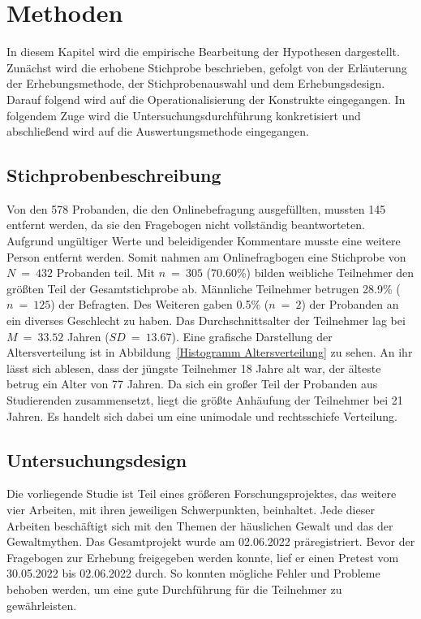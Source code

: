 \chapter{Methoden}   \label{ch_3}
In diesem Kapitel wird die empirische Bearbeitung der Hypothesen dargestellt. Zunächst wird die erhobene Stichprobe beschrieben, gefolgt von der Erläuterung der Erhebungsmethode, der Stichprobenauswahl und dem Erhebungsdesign. Darauf folgend wird auf die Operationalisierung der Konstrukte eingegangen. In folgendem Zuge wird die Untersuchungsdurchführung konkretisiert und abschließend wird auf die Auswertungsmethode eingegangen.

\section{Stichprobenbeschreibung} \label{sec_3.1}
Von den 578 Probanden, die den Onlinebefragung ausgefüllten, mussten 145 entfernt werden, da sie den Fragebogen nicht vollständig beantworteten. Aufgrund ungültiger Werte und beleidigender Kommentare musste eine weitere Person entfernt werden. Somit nahmen am Onlinefragbogen eine Stichprobe von $N~=~432$ Probanden teil. 
Mit $n~=~305$ (70.60\%) bilden weibliche Teilnehmer den größten Teil der Gesamtstichprobe ab. Männliche Teilnehmer betrugen 28.9\% ($n~=~125$) der Befragten. Des Weiteren gaben 0.5\% ($n~=~2$) der Probanden an ein diverses Geschlecht zu haben. Das Durchschnittsalter der Teilnehmer lag bei $M~=~33.52$ Jahren ($SD~=~13.67$). Eine grafische Darstellung der Altersverteilung ist in Abbildung~\ref{Histogramm Altersverteilung} zu sehen. An ihr lässt sich ablesen, dass der jüngste Teilnehmer 18 Jahre alt war, der älteste betrug ein Alter von 77 Jahren. Da sich ein großer Teil der Probanden aus Studierenden zusammensetzt, liegt die größte Anhäufung der Teilnehmer bei 21 Jahren. Es handelt sich dabei um eine unimodale und rechtsschiefe Verteilung. 


\section{Untersuchungsdesign}  \label{sec_3.2}
Die vorliegende Studie ist Teil eines größeren Forschungsprojektes, das weitere vier Arbeiten, mit ihren jeweiligen Schwerpunkten, beinhaltet. Jede dieser Arbeiten beschäftigt sich mit den Themen der häuslichen Gewalt und das der Gewaltmythen. Das Gesamtprojekt wurde am 02.06.2022 präregistriert. Bevor der Fragebogen zur Erhebung freigegeben werden konnte, lief er einen Pretest vom 30.05.2022 bis 02.06.2022 durch. So konnten mögliche Fehler und Probleme behoben werden, um eine gute Durchführung für die Teilnehmer zu gewährleisten. 

